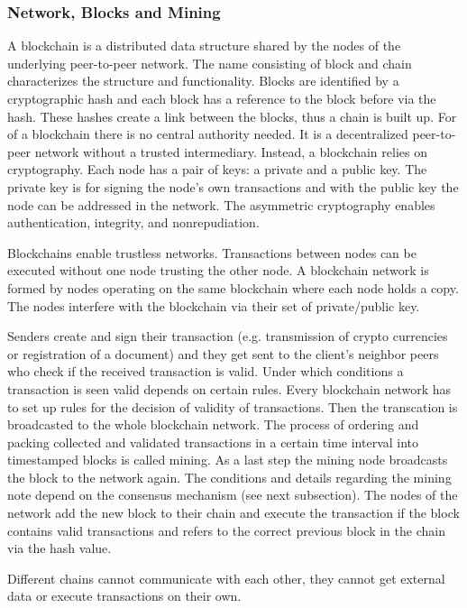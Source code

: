 \documentclass[conference]{IEEEtran}
\begin{document}
\subsubsection{Network, Blocks and Mining}
A blockchain is a distributed data structure shared by the nodes of the underlying peer-to-peer network. The name consisting of block and chain characterizes the structure and functionality. Blocks are identified by a cryptographic hash and each block has a reference to the block before via the hash. These hashes create a link between the blocks, thus a chain is built up. For of a blockchain there is no central authority needed. It is a decentralized peer-to-peer network without a trusted intermediary. Instead, a blockchain relies on cryptography. Each node has a pair of keys: a private and a public key. The private key is for signing the node's own transactions and with the public key the node can be addressed in the network. The asymmetric cryptography enables authentication, integrity, and nonrepudiation.\cite{Christidis2016} \par
Blockchains enable trustless networks. Transactions between nodes can be executed without one node trusting the other node. A blockchain network is formed by nodes operating on the same blockchain where each node holds a copy. The nodes interfere with the blockchain via their set of private/public key.\cite{Christidis2016} \par
Senders create and sign their transaction (e.g. transmission of crypto currencies or registration of a document) and they get sent to the client's neighbor peers who check if the received transaction is valid. Under which conditions a transaction is seen valid depends on certain rules. Every blockchain network has to set up rules for the decision of validity of transactions. Then the transcation is broadcasted to the whole blockchain network. The process of ordering and packing collected and validated transactions in a certain time interval into timestamped blocks is called mining. As a last step the mining node broadcasts the block to the network again. The conditions and details regarding the mining note depend on the consensus mechanism (see next subsection). The nodes of the network add the new block to their chain and execute the transaction if the block contains valid transactions and refers to the correct previous block in the chain via the hash value.\cite{Christidis2016}\cite{Prinz2017}\par
Different chains cannot communicate with each other, they cannot get external data or execute transactions on their own.\cite{Wang2017}\par
\end{document}
